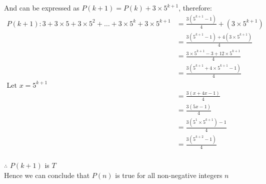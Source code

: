 \documentclass[12pt letter]{report}
\begin{document}
{  And can be expressed as $P \left( k + 1 \right) = P \left( k \right) + 3 \times 5^{k + 1}  $, therefore:
  \begin{align*}
    P \left( k + 1 \right) : 3 + 3\times 5 + 3 \times 5^2 + \ldots + 3 \times 5^{k} + 3 \times 5^{k + 1} & = \frac{3
    \left( 5^{k + 1} - 1 \right) }{4} + \left( 3 \times 5^{k + 1} \right)                                                                                                                     \\
                                                                                                         & = \frac{3 \left( 5^{k + 1} - 1 \right) + 4 \left( 3 \times 5^{k + 1} \right)  }{4} \\
                                                                                                         & = \frac{3 \times 5^{k + 1} - 3 + 12 \times 5^{k + 1} }{4}                          \\
                                                                                                         & = \frac{3 \left( 5^{k + 1} + 4 \times 5^{k + 1} - 1 \right) }{4}                   \\
    \text{Let } x =
    5^{k + 1}                                                                                                                                                                                 \\
                                                                                                         & = \frac{3 \left( x + 4x - 1 \right) }{4}                                           \\
                                                                                                         & = \frac{3 \left( 5x - 1 \right)}{4}                                                \\
                                                                                                         & = \frac{3 \left( 5^{1} \times 5^{k + 1} \right) - 1 }{4}                           \\
                                                                                                         & = \frac{3 \left( 5^{k + 2} - 1 \right) }{4}                                        \\
  \end{align*}

  \noindent $\therefore$ $P \left( k +1 \right) $ is $T$ \\
  Hence we can conclude that $P \left( n \right) $ is true for all non-negative integers $n$

}
\end{document}
